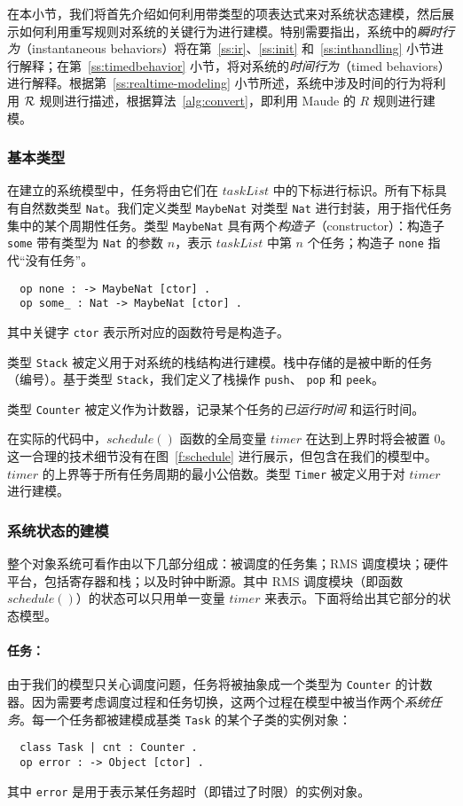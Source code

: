 在本小节，我们将首先介绍如何利用带类型的项表达式来对系统状态建模，然后展示如何利用重写规则对系统的关键行为进行建模。特别需要指出，系统中的\emph{瞬时行为}（instantaneous  behaviors）将在第~\ref{ss:ir}、\ref{ss:init} 和~\ref{ss:inthandling} 小节进行解释；在第~\ref{ss:timedbehavior} 小节，将对系统的\emph{时间行为}（timed behaviors）进行解释。根据第~\ref{ss:realtime-modeling} 小节所述，系统中涉及时间的行为将利用 $\mathcal{R}$ 规则进行描述，根据算法~\ref{alg:convert}，即利用 Maude 的 $R$ 规则进行建模。

\subsubsection{基本类型}

在建立的系统模型中，任务将由它们在 $\mathit{taskList}$ 中的下标进行标识。所有下标具有自然数类型 \verb|Nat|。我们定义类型 \verb|MaybeNat| 对类型 \verb|Nat| 进行封装，用于指代任务集中的某个周期性任务。类型 \verb|MaybeNat| 具有两个\emph{构造子}（constructor）：构造子 \verb|some| 带有类型为 \verb|Nat| 的参数 $n$，表示 $\mathit{taskList}$ 中第 $n$ 个任务；构造子 \verb|none| 指代“没有任务”。
\begin{verbatim}
  op none : -> MaybeNat [ctor] .
  op some_ : Nat -> MaybeNat [ctor] .
\end{verbatim}
其中关键字 \verb|ctor| 表示所对应的函数符号是构造子。

类型 \verb|Stack| 被定义用于对系统的栈结构进行建模。栈中存储的是被中断的任务（编号）。基于类型 \verb|Stack|，我们定义了栈操作 \verb|push|、 \verb|pop| 和 \verb|peek|。

类型 \verb|Counter| 被定义作为计数器，记录某个任务的\emph{已运行时间} 和运行时间。

在实际的代码中，$\mathit{schedule()}$ 函数的全局变量 $\mathit{timer}$ 在达到上界时将会被置 0。这一合理的技术细节没有在图~\ref{f:schedule} 进行展示，但包含在我们的模型中。$\mathit{timer}$ 的上界等于所有任务周期的最小公倍数。类型 \verb|Timer| 被定义用于对 $\mathit{timer}$ 进行建模。

\subsubsection{系统状态的建模}

整个对象系统可看作由以下几部分组成：被调度的任务集；RMS 调度模块；硬件平台，包括寄存器和栈；以及时钟中断源。其中 RMS 调度模块（即函数 $\mathit{schedule()}$）的状态可以只用单一变量 $\mathit{timer}$ 来表示。下面将给出其它部分的状态模型。

\paragraph{任务：} 由于我们的模型只关心调度问题，任务将被抽象成一个类型为 \verb|Counter| 的计数器。因为需要考虑调度过程和任务切换，这两个过程在模型中被当作两个\emph{系统任务}。每一个任务都被建模成基类 \verb|Task| 的某个子类的实例对象：
\begin{verbatim}
  class Task | cnt : Counter .
  op error : -> Object [ctor] .
\end{verbatim}
其中 \verb|error| 是用于表示某任务超时（即错过了时限）的实例对象。

